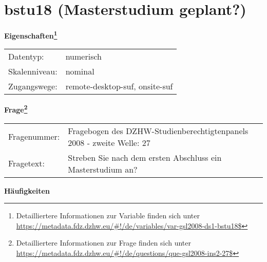 
    \setcounter{footnote}{0}

    \vspace*{-1.8cm}
	\section{bstu18 (Masterstudium geplant?)}
	\label{section:bstu18}



    \vspace*{0.5cm}
    \noindent\textbf{Eigenschaften\footnote{Detailliertere Informationen zur Variable finden sich unter
		\url{https://metadata.fdz.dzhw.eu/\#!/de/variables/var-gsl2008-ds1-bstu18$}}}\\
	\begin{tabularx}{\hsize}{@{}lX}
	Datentyp: & numerisch \\
	Skalenniveau: & nominal \\
	Zugangswege: &
	  remote-desktop-suf, 
	  onsite-suf
 \\
    \end{tabularx}



				\vspace*{0.5cm}
                \noindent\textbf{Frage\footnote{Detailliertere Informationen zur Frage finden sich unter
		              \url{https://metadata.fdz.dzhw.eu/\#!/de/questions/que-gsl2008-ins2-27$}}}\\
				\begin{tabularx}{\hsize}{@{}lX}
					Fragenummer: &
					  Fragebogen des DZHW-Studienberechtigtenpanels 2008 - zweite Welle:
					  27
 \\
					Fragetext: & Streben Sie nach dem ersten Abschluss ein Masterstudium an? \\
				\end{tabularx}





        		\vspace*{0.5cm}
                \noindent\textbf{Häufigkeiten}

